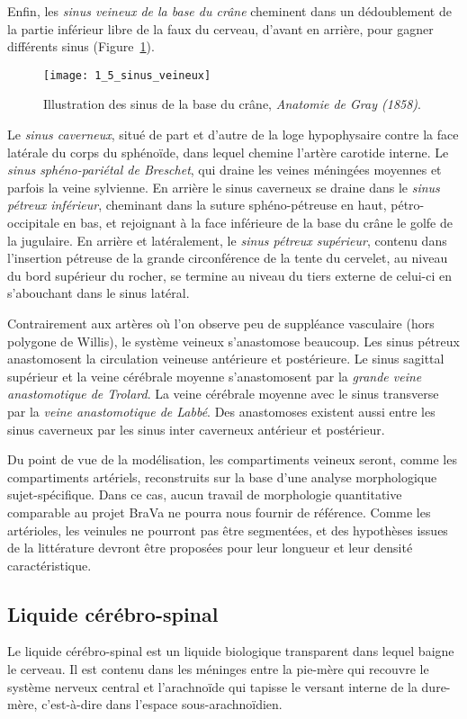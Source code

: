 Enfin, les {\em sinus veineux de la base du crâne} cheminent dans un dédoublement de la partie inférieur libre de la faux du cerveau, d’avant en arrière, pour gagner différents sinus (Figure~\ref{fig:1_5_sinus_veineux}). 
\begin{figure}[!t]
\centering
\texttt{[image: 1\_5\_sinus\_veineux]}
\caption{Illustration des sinus de la base du cr\^ane, {\em Anatomie de Gray (1858)}. }
\label{fig:1_5_sinus_veineux}	
\end{figure}
Le {\em sinus caverneux}, situé de part et d’autre de la loge hypophysaire contre la face latérale du corps du sphénoïde, dans lequel chemine l’artère carotide interne. Le {\em sinus sphéno-pariétal de Breschet}, qui draine les veines méningées moyennes et parfois la veine sylvienne. En arrière le sinus caverneux se draine dans le {\em sinus pétreux inférieur}, cheminant dans la suture sphéno-pétreuse en haut, pétro-occipitale en bas, et rejoignant à la face inférieure de la base du crâne le golfe de la jugulaire. En arrière et latéralement, le {\em sinus pétreux supérieur}, contenu dans l’insertion pétreuse de la grande circonférence de la tente du cervelet, au niveau du bord supérieur du rocher, se termine au niveau du tiers externe de celui-ci en s’abouchant dans le sinus latéral.

Contrairement aux artères où l’on observe peu de suppléance vasculaire (hors polygone de Willis), le système veineux s’anastomose beaucoup. Les sinus pétreux anastomosent la circulation veineuse antérieure et postérieure. Le sinus sagittal supérieur et la veine cérébrale moyenne s’anastomosent par la {\em grande veine anastomotique de Trolard}. La veine cérébrale moyenne avec le sinus transverse par la {\em veine anastomotique de Labbé}. Des anastomoses existent aussi entre les sinus caverneux par les sinus inter caverneux antérieur et postérieur.

Du point de vue de la modélisation, les compartiments veineux seront, comme les compartiments artériels, reconstruits sur la base d'une analyse morphologique sujet-spécifique. Dans ce cas, aucun travail de morphologie quantitative comparable au projet BraVa ne pourra nous fournir de référence. Comme les artérioles, les veinules ne pourront pas être segmentées, et des hypothèses issues de la littérature devront être proposées pour leur longueur et leur densité caractéristique.  
\subsection{Liquide cérébro-spinal}
Le liquide cérébro-spinal est un liquide biologique transparent dans lequel baigne le cerveau. Il est contenu dans les méninges entre la pie-mère qui recouvre le système nerveux central et l’arachnoïde qui tapisse le versant interne de la dure-mère, c’est-à-dire dans l’espace sous-arachnoïdien.

